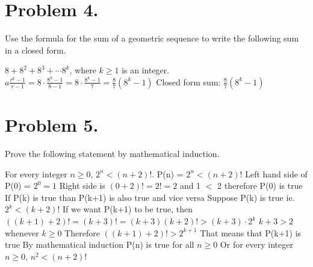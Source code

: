 \documentclass[11pt]{article}
\begin{document}
\newpage

\noindent
\section*{Problem 4.}

Use the formula for the sum of a geometric sequence to write the following sum in a closed form.
\newline

$8+8^2+8^3+\cdots 8^k$, where $k\geq 1$ is an integer.
\newline
\newline
$a\frac{r^k-1}{r-1} = 8 \cdot \frac{8^k-1}{8-1} = 8 \cdot \frac{8^k-1}{7} = \frac{8}{7}(8^k-1)$
\newline
\newline
Closed form sum: $\frac{8}{7}(8^k-1)$

\newpage


\section*{Problem 5.}

Prove the following statement by mathematical induction.
\newline

For every integer $n\geq 0$, $2^n<(n+2)!$.
\newline
\newline
P(n) = $2^n<(n+2)!$
\newline
Left hand side of P(0) = $2^0 = 1$
\newline
Right side is $(0+2)! = 2! = 2$
and 1 $<$ 2 therefore P(0) is true
\newline
\newline
If P(k) is true than P(k+1) is also true and vice versa
\newline
\newline
Suppose P(k) is true ie. $2^k < (k+2)!$
\newline
If we want P(k+1) to be true, then $((k+1)+2)! = (k+3)! = (k+3)(k+2)! > (k+3)\cdot 2^k$
\newline
$k+3 > 2$ whenever $k\geq0$
\newline
Therefore $((k+1)+2)! > 2^{k+1}$
\newline
That means that P(k+1) is true
\newline
\newline
By mathematical induction P(n) is true for all $n \geq 0$
\newline
Or for every integer $n \geq 0$, $n^2 < (n+2)!$


\end{document}
